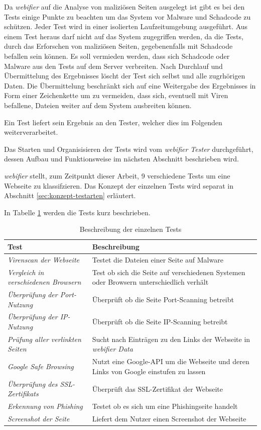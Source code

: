 Da \textit{webifier} auf die Analyse von maliziösen Seiten ausgelegt ist gibt es bei den Tests
einige Punkte zu beachten um das System vor Malware und Schadcode zu schützen.
Jeder Test wird in einer isolierten Laufzeitumgebung ausgeführt. Aus einem Test
heraus darf nicht auf das System zugegriffen werden, da die Tests, durch das Erforschen von
maliziösen Seiten, gegebenenfalls mit Schadcode befallen sein können. Es soll vermieden werden,
dass sich Schadcode oder Malware aus den Tests auf dem Server verbreiten. Nach Durchlauf und
Übermittelung des Ergebnisses löscht der Test sich selbst und alle zugrhörigen Daten. Die
Übermittelung beschränkt sich auf eine Weitergabe des Ergebnisses in Form einer Zeichenkette um zu
vermeiden, dass sich, eventuell mit Viren befallene, Dateien weiter auf dem System ausbreiten
können.

Ein Test liefert sein Ergebnis an den Tester, welcher dies im Folgenden weiterverarbeitet.

Das Starten und Organisisieren der Tests wird vom \textit{webifier Tester} durchgeführt, dessen
Aufbau und Funktionsweise im nächsten Abschnitt beschrieben wird.

\textit{webifier} stellt, zum Zeitpunkt dieser Arbeit, 9 verschiedene Tests um eine Webseite zu
klassifzieren.
Das Konzept der einzelnen Tests wird separat in Abschnitt
\ref{sec:konzept-testarten} erläutert.

In Tabelle \ref{tbl:tests} werden die Tests kurz beschrieben.

\begin{table}[H]
\centering
\begin{tabularx}{\textwidth}{|l|X|}
\hline
\textbf{Test} & \textbf{Beschreibung} \\\hline
\textit{Virenscan der Webseite} & Testet die Dateien einer Seite auf Malware \\\hline
\textit{Vergleich in verschiedenen Browsern} & Test ob sich die Seite auf verschiedenen Systemen
oder Browsern unterschiedlich verhält \\\hline
\textit{Überprüfung der Port-Nutzung} & Überprüft ob die Seite Port-Scanning betreibt \\\hline
\textit{Überprüfung der IP-Nutzung} & Überprüft ob die Seite IP-Scanning betreibt \\\hline
\textit{Prüfung aller verlinkten Seiten} & Sucht nach Einträgen zu den Links der Webseite
in \textit{webifier Data} \\\hline
\textit{Google Safe Browsing} & Nutzt eine Google-API um die Webseite und deren Links von Google
einstufen zu lassen \\\hline
\textit{Überprüfung des SSL-Zertifikats} & Überprüft das \acs{SSL}-Zertifikat der Webseite \\\hline
\textit{Erkennung von Phishing} & Testet ob es sich um eine Phishingseite handelt \\\hline
\textit{Screenshot der Seite} & Liefert dem Nutzer einen Screenshot der Webseite \\\hline
\end{tabularx}
\caption{Beschreibung der einzelnen Tests}
\label{tbl:tests}
\end{table}

